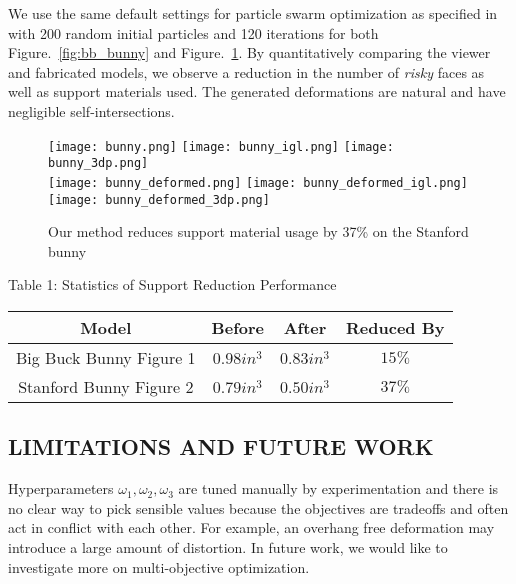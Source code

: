 We use the same default settings for particle swarm optimization as specified in \cite{jacobson_matryoshka_2017} with 200 random initial particles and 120 iterations for both Figure.~\ref{fig:bb_bunny} and Figure.~\ref{fig:bunny}. By quantitatively comparing the viewer and fabricated models, we observe a reduction in the number of \textit{risky} faces as well as support materials used. The generated deformations are natural and have negligible self-intersections.

\begin{figure}[ht]
    \centering
    \texttt{[image: bunny.png]}
    \texttt{[image: bunny\_igl.png]} 
    \texttt{[image: bunny\_3dp.png]}
    \\
    \texttt{[image: bunny\_deformed.png]} 
    \texttt{[image: bunny\_deformed\_igl.png]} 
    \texttt{[image: bunny\_deformed\_3dp.png]}
    \caption{Our method reduces support material usage by 37\% on the Stanford bunny}
    \label{fig:bunny}
\end{figure}

\begin{center}
    Table 1: Statistics of Support Reduction Performance
\end{center}

\begin{center}
    \begin{tabular}{ |c|c|c|c| } 
    \hline
    \textbf{Model} & \textbf{Before} & \textbf{After} & \textbf{Reduced By}\\
    \hline
    Big Buck Bunny Figure 1 & $0.98 in^{3}$ & $0.83 in^{3}$ & $15\%$\\ 
    \hline
    Stanford Bunny Figure 2 & $0.79in^{3}$ & $0.50in^{3}$ & $37\%$ \\ 
    \hline
    \end{tabular}
\end{center}

\begin{center}
   
\end{center}


\subsection*{LIMITATIONS AND FUTURE WORK}

Hyperparameters $\omega_1, \omega_2, \omega_3$ are tuned manually by experimentation and there is no clear way to pick sensible values because the objectives are tradeoffs and often act in conflict with each other. For example, an overhang free deformation may introduce a large amount of distortion. In future work, we would like to investigate more on multi-objective optimization.

